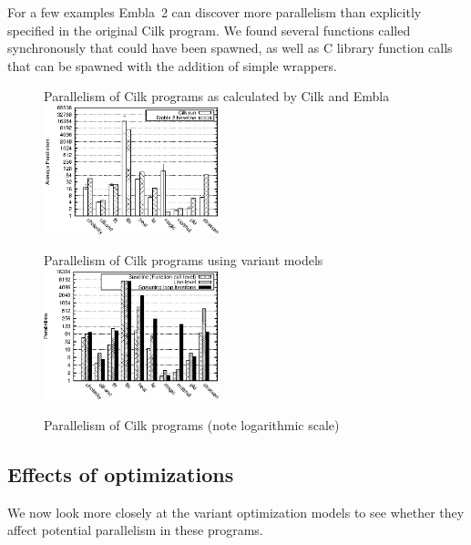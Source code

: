For a few examples Embla~2 can discover more parallelism than explicitly specified in the original Cilk program.
We found several functions called synchronously that could have been spawned,
as well as C library function calls
that can be spawned with the addition of simple wrappers.

\begin{figure}[t]
 \begin{center}
  \begin{SubFloat}{\label{cilk-run}Parallelism of Cilk programs as calculated by Cilk and Embla}
   \includegraphics[width=2.0in]{cilk-run}
  \end{SubFloat}
 \qquad
  \begin{SubFloat}{\label{cilk-gran-loop}Parallelism of Cilk programs using variant models}
   \includegraphics[width=2.0in]{cilk-gran-loop}
  \end{SubFloat}
 \end{center}
 \caption{Parallelism of Cilk programs (note logarithmic scale)}
\end{figure}

\subsection{Effects of optimizations} \label{sresults:cilk-opts}

We now look more closely at the variant optimization models to see whether they affect potential parallelism in these programs.

